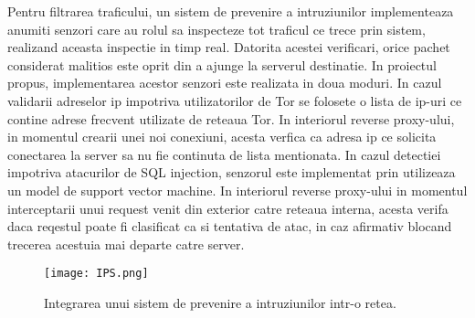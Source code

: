 Pentru filtrarea traficului, un sistem de prevenire a intruziunilor implementeaza anumiti senzori care au rolul sa inspecteze tot traficul ce trece prin sistem, realizand aceasta inspectie in timp real. Datorita acestei verificari, orice pachet considerat malitios este oprit din a ajunge la serverul destinatie. In proiectul propus, implementarea acestor senzori este realizata in doua moduri. In cazul validarii adreselor ip impotriva utilizatorilor de Tor se folosete o lista de ip-uri ce contine adrese frecvent utilizate de reteaua Tor. In interiorul reverse proxy-ului, in momentul crearii unei noi conexiuni, acesta verfica ca adresa ip ce solicita conectarea la server sa nu fie continuta de lista mentionata. In cazul detectiei impotriva atacurilor de SQL injection, senzorul este implementat prin utilizeaza un model de support vector machine. In interiorul reverse proxy-ului in momentul interceptarii unui request venit din exterior catre reteaua interna, acesta verifa daca reqestul poate fi clasificat ca si tentativa de atac, in caz afirmativ blocand trecerea acestuia mai departe catre server.
\begin{figure}[h]
	\centering
	\texttt{[image: IPS.png]}
	\caption{Integrarea unui sistem de prevenire a intruziunilor intr-o retea.}
	\label{fig:ips-2nd-example}
\end{figure}

